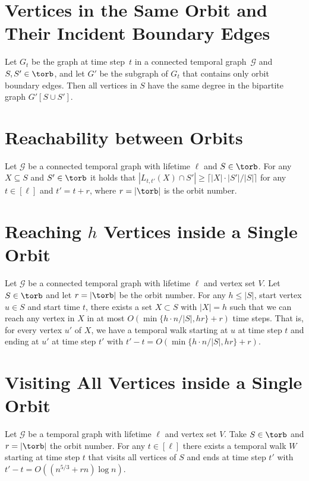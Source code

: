 {\section{Vertices in the Same Orbit and Their Incident Boundary Edges}
\begin{lemma}\label{lem:orbitedges} {Let $G_t$ be the graph at time
    step~$t$ in a connected temporal graph~$\mathcal{G}$ and $S,S' \in \torb$,
    and let $G'$ be the subgraph of $G_t$ that contains only orbit boundary
    edges. Then all vertices in $S$ have the same degree in the bipartite graph
    $G'[S \cup S']$.}
\end{lemma}
\prooforbitedges

\section{Reachability between Orbits}
\begin{lemma} Let
    $\mathcal{G}$ be a connected temporal graph with lifetime $\ell$ and $S \in
    \torb$. For any $X \subseteq S$ and $S' \in \torb$ it holds that $|L_{t,
    t'}(X) \cap S'| \geq  \lceil |X| \cdot |S'|/|S| \rceil$ for any $t \in
    [\ell]$ and $t'=t+r$, where $r=|\torb|$ is the orbit number.
\end{lemma}
\prooflaneorbit

\section{Reaching $h$ Vertices inside a Single Orbit}
\begin{lemma} 
Let $\mathcal{G}$ be a connected temporal graph with lifetime $\ell$ and vertex
set $V$. Let $S \in \torb$ and let $r=|\torb|$ be the orbit number. For any $h
\leq |S|$, start vertex {$u \in S$} {and start time $t$}, there exists a set $X
\subset S$ {with $|X|=h$} such that we can reach any vertex in $X$ in at most
$O(\min\{h \cdot n / |S|, h r\}+r)$ time steps. That is, for every vertex $u'$
of $X$, we have a temporal walk starting at $u$ at time step $t$ and ending at
$u'$ at time step $t'$ with $t'-t=O(\min\{h \cdot n / |S|, h r\}+r)$.
 \end{lemma}
\proofnextreachable

\section{Visiting All Vertices inside a Single Orbit}
\begin{theorem} Let $\mathcal{G}$ be a temporal graph
    with lifetime $\ell$ and vertex set $V$. Take $S \in \torb$ and $r=|\torb|$
    the orbit number. For any $t\in[\ell]$ there exists a temporal walk $W$
    starting at time step $t$ that visits all vertices of $S$ and ends at time
    step $t'$ with $t'-t=O((n^{5/3}+rn)\log n)$. 
\end{theorem}
\prooforbitexplore

}
